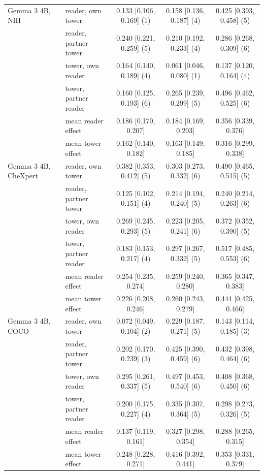 \begin{table}[htbp]
\begin{tabular}{llccc}
\midrule
Gemma 3 4B, NIH & reader, own tower & 0.133 [0.106, 0.169] (1) & 0.158 [0.136, 0.187] (4) & 0.425 [0.393, 0.458] (5) \\
 & reader, partner tower & 0.240 [0.221, 0.259] (5) & 0.210 [0.192, 0.233] (4) & 0.286 [0.268, 0.309] (6) \\
 & tower, own reader & 0.164 [0.140, 0.189] (4) & 0.061 [0.046, 0.080] (1) & 0.137 [0.120, 0.164] (4) \\
 & tower, partner reader & 0.160 [0.125, 0.193] (6) & 0.265 [0.239, 0.299] (5) & 0.496 [0.462, 0.525] (6) \\
 & \quad mean reader effect & 0.186 [0.170, 0.207] & 0.184 [0.169, 0.203] & 0.356 [0.339, 0.376] \\
 & \quad mean tower effect & 0.162 [0.140, 0.182] & 0.163 [0.149, 0.185] & 0.316 [0.299, 0.338] \\
\addlinespace
Gemma 3 4B, CheXpert & reader, own tower & 0.382 [0.353, 0.412] (5) & 0.303 [0.273, 0.332] (6) & 0.490 [0.465, 0.515] (5) \\
 & reader, partner tower & 0.125 [0.102, 0.151] (4) & 0.214 [0.194, 0.240] (5) & 0.240 [0.214, 0.263] (6) \\
 & tower, own reader & 0.269 [0.245, 0.293] (5) & 0.223 [0.205, 0.241] (6) & 0.372 [0.352, 0.390] (5) \\
 & tower, partner reader & 0.183 [0.153, 0.217] (4) & 0.297 [0.267, 0.332] (5) & 0.517 [0.485, 0.553] (6) \\
 & \quad mean reader effect & 0.254 [0.235, 0.274] & 0.259 [0.240, 0.280] & 0.365 [0.347, 0.383] \\
 & \quad mean tower effect & 0.226 [0.208, 0.246] & 0.260 [0.243, 0.279] & 0.444 [0.425, 0.466] \\
\addlinespace
Gemma 3 4B, COCO & reader, own tower & 0.072 [0.049, 0.104] (2) & 0.229 [0.187, 0.271] (5) & 0.143 [0.114, 0.185] (3) \\
 & reader, partner tower & 0.202 [0.170, 0.239] (3) & 0.425 [0.390, 0.459] (6) & 0.432 [0.398, 0.464] (6) \\
 & tower, own reader & 0.295 [0.261, 0.337] (5) & 0.497 [0.453, 0.540] (6) & 0.408 [0.368, 0.450] (6) \\
 & tower, partner reader & 0.200 [0.175, 0.227] (4) & 0.335 [0.307, 0.364] (5) & 0.298 [0.273, 0.326] (5) \\
 & \quad mean reader effect & 0.137 [0.119, 0.161] & 0.327 [0.298, 0.354] & 0.288 [0.265, 0.315] \\
 & \quad mean tower effect & 0.248 [0.228, 0.271] & 0.416 [0.392, 0.441] & 0.353 [0.331, 0.379] \\

\end{tabular}
\end{table}
